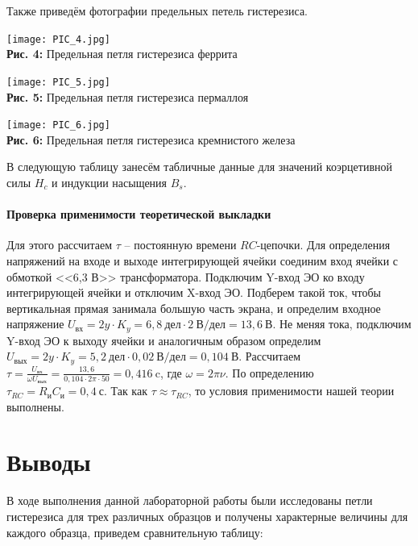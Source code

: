 \documentclass[12pt,a4paper]{scrartcl}
\begin{document}
Также приведём фотографии предельных петель гистерезиса.

	\begin{center}
		\texttt{[image: PIC\_4.jpg]}
		\\\textbf{Рис. 4: } Предельная петля гистерезиса феррита
	\end{center}
	
	\begin{center}
		\texttt{[image: PIC\_5.jpg]}
		\\\textbf{Рис. 5: } Предельная петля гистерезиса пермаллоя
	\end{center}
	
		\begin{center}
		\texttt{[image: PIC\_6.jpg]}
		\\\textbf{Рис. 6: } Предельная петля гистерезиса кремнистого железа
	\end{center}
	
В следующую таблицу занесём табличные данные для значений коэрцетивной силы $ H_c $ и индукции насыщения $ B_s $.

\paragraph{Проверка применимости теоретической выкладки} \hfill

Для этого рассчитаем $\tau$ -- постоянную времени $ RC $-цепочки. Для определения напряжений на входе и выходе интегрирующей ячейки соединим вход ячейки с обмоткой <<6,3 В>> трансформатора. Подключим Y-вход ЭО ко входу интегрирующей ячейки и отключим X-вход ЭО. Подберем такой ток, чтобы вертикальная прямая занимала большую часть экрана, и определим входное напряжение $U_{\text{вх}}=2y\cdot K_y=6,8\ \text{дел} \cdot 2\ \text{В/дел}=13,6\ \text{В}$. Не меняя тока, подключим Y-вход ЭО к выходу ячейки и аналогичным образом определим $U_{\text{вых}}=2y\cdot K_y=5,2\ \text{дел} \cdot 0,02\ \text{В/дел}=0,104\ \text{В}$. Рассчитаем $\tau=\frac{U_{\text{вх}}}{\omega U_{\text{вых}}}=\frac{13,6}{0,104\cdot2\pi\cdot 50}=0,416\ \text{c}$, где $\omega=2\pi\nu$. По определению $\tau_{RC}=R_\text{и}C_\text{и}=0,4\ \text{с}$. Так как $\tau\approx\tau_{RC}$, то условия применимости нашей теории выполнены.

\section{Выводы}
В ходе выполнения данной лабораторной работы были исследованы петли гистерезиса для трех различных образцов и получены характерные величины для каждого образца, приведем сравнительную таблицу:
\end{document}
